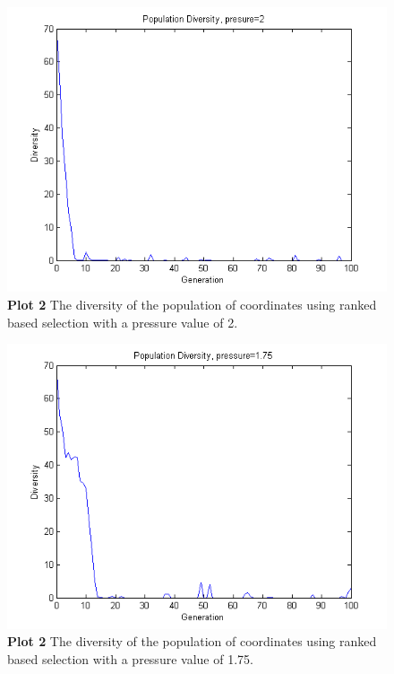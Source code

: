 \documentclass[a4paper]{article}
\begin{document}
\begin{figure}[H] %
	\includegraphics[scale=0.7]{divPress2.png}
	\caption{\label{fig:plot2Diversity2}\textbf{Plot 2} The diversity of the population of coordinates using ranked based selection with a pressure value of 2.}
\end{figure}
\begin{figure}[H] %
	\includegraphics[scale=0.7]{divPress175.png}
	\caption{\label{fig:plot2Diversity175}\textbf{Plot 2} The diversity of the population of coordinates using ranked based selection with a pressure value of 1.75.}
\end{figure}
\end{document}
